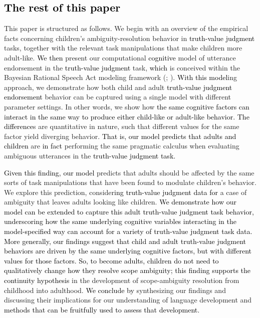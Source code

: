 \documentclass[cm]{glossa}
\newcommand{\lsp}[1]{\textcolor{red}{[lsp: #1]}}
\newcommand{\lp}[1]{\textcolor{black}{#1}} %
\begin{document}
\subsection{\lp{The rest of this paper}}
This paper is structured as follows. We begin 
with an overview of the empirical facts concerning children's ambiguity-resolution behavior in 
\lp{truth-value judgment}
tasks, together with the relevant task manipulations that make children more adult-like. 
\lp{We then}
present our computational \lp{cognitive} model of utterance endorsement in the 
\lp{truth-value judgment}
task,
\lp{which}
is conceived within the Bayesian Rational Speech Act modeling framework (\citealp{goodmanfrank2016}; \citealp{scontrasetalproblang}). 
\lp{With this model}ing approach, we demonstrate how both child and adult \lp{truth-value judgment endorsement} behavior can be captured using a single model with different parameter settings.
In other words, we show how \lp{the same cognitive factors can interact in the same way to produce either child-like or adult-like behavior. The difference}s are quantitative in nature, such that different values for the same factor yield diverging behavior.
\lp{That is, our model predicts that adults and children} 
 are \lp{in fact} performing the same pragmatic calculus when evaluating ambiguous utterances in the 
\lp{truth-value judgment task.}

\lp{Given this finding, our model}
predicts that adults should be affected by the same sorts of task manipulations that have been found to modulate children's behavior.
We explore this prediction, 
consider\lp{ing}
\lp{truth-value judgment data for}
a case of ambiguity that leaves adults looking like children.
\lp{We demonstrate how our model can be extended to capture this adult truth-value judgment task behavior, underscoring how the same underlying cognitive variables interacting in the model-specified way can account for a variety of truth-value judgment task data.}
\lp{More generally, our findings suggest that child and adult truth-value judgment behaviors are driven by the same underlying cognitive factors, but with different values for those factors. So, to become adults, children do not need to qualitatively change how they resolve scope ambiguity; this finding supports the continuity hypothesis}
  in the development of scope-ambiguity resolution from childhood into adulthood. 
  \lp{We conclude by}
  synthesizing our findings and discussing their implications for our understanding of language development and 
  \lp{methods that can be fruitfully used to assess that development.}
\end{document}
